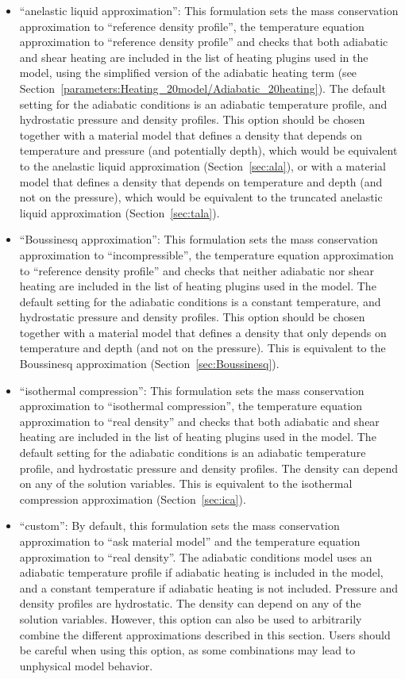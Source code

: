 \documentclass{article}
\begin{document}
\begin{itemize}
 \item
``anelastic liquid approximation'': This formulation sets the mass conservation approximation to ``reference density profile'',
the temperature equation approximation to ``reference density profile'' and checks that both
adiabatic and shear heating are included in the list of heating plugins used in the model, using the
simplified version of the adiabatic heating term
(see Section~\ref{parameters:Heating_20model/Adiabatic_20heating}).
The default setting for the adiabatic conditions is an adiabatic temperature profile, and hydrostatic
pressure and density profiles. This option should be chosen together with a material model
that defines a density that depends on temperature and pressure (and potentially depth),
which would be equivalent to the anelastic liquid approximation (Section~\ref{sec:ala}),
or with a material model that defines a density that depends on temperature and depth
(and not on the pressure), which would be equivalent to the truncated anelastic liquid approximation
(Section~\ref{sec:tala}).

\item
``Boussinesq approximation'': This formulation sets the mass conservation approximation to ``incompressible'',
the temperature equation approximation to ``reference density profile'' and checks that neither
adiabatic nor shear heating are included in the list of heating plugins used in the model.
The default setting for the adiabatic conditions is a constant temperature, and hydrostatic
pressure and density profiles. This option should be chosen together with a material model
that defines a density that only depends on temperature and depth (and not on the pressure).
This is equivalent to the Boussinesq approximation (Section~\ref{sec:Boussinesq}).

\item
``isothermal compression'': This formulation sets the mass conservation approximation to
``isothermal compression'', the temperature equation approximation to ``real density''
and checks that both
adiabatic and shear heating are included in the list of heating plugins used in the model.
The default setting for the adiabatic conditions is an adiabatic temperature profile, and hydrostatic
pressure and density profiles. The density can depend on any of the solution variables.
This is equivalent to the isothermal compression approximation (Section~\ref{sec:ica}).

\item
``custom'': By default, this formulation sets the mass conservation approximation
to ``ask material model'' and the temperature equation approximation to ``real density''.
The adiabatic conditions model uses an adiabatic temperature profile if adiabatic heating
is included in the model, and a constant temperature if adiabatic heating is not included.
Pressure and density profiles are hydrostatic. The density can depend on any of the solution variables.
However, this option can also be used to arbitrarily combine the different approximations
described in this section. Users should be careful when using this option, as some combinations
may lead to unphysical model behavior.
\end{itemize}
\end{document}
